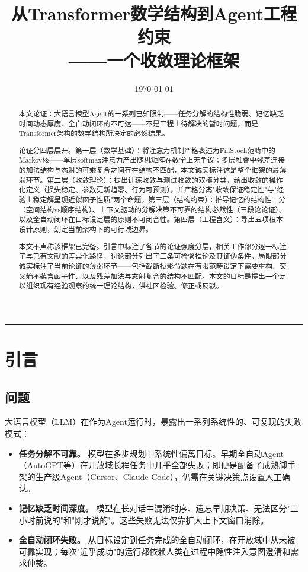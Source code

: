 \documentclass[11pt,a4paper]{ctexart}
\title{\textbf{从Transformer数学结构到Agent工程约束\\[10pt]——一个收敛理论框架}}
\date{\today}
\author{}
\begin{document}
\maketitle

\begin{center}
\rule{0.8\textwidth}{0.5pt}
\end{center}

\begin{abstract}
\noindent
本文论证：大语言模型Agent的一系列已知限制——任务分解的结构性脆弱、记忆缺乏时间动态厚度、全自动闭环的不可达——不是工程上待解决的暂时问题，而是Transformer架构的数学结构所决定的必然结果。

论证分四层展开。第一层（数学基础）：将注意力机制严格表述为FinStoch范畴中的Markov核——单层softmax注意力产出随机矩阵在数学上无争议；多层堆叠中残差连接的加法结构与态射的可乘复合之间存在结构不匹配，本文诚实标注这是整个框架的最薄弱环节。第二层（收敛理论）：提出训练收敛与测试收敛的双模分类，给出收敛的操作化定义（损失稳定、参数更新趋零、行为可预测），并严格分离"收敛保证稳定性"与"经验上稳定解呈现近似函子性质"两个命题。第三层（结构约束）：推导记忆的结构性二分（空间结构vs顺序结构）、上下文驱动的分解决策不可靠的结构必然性（三段论论证）、以及全自动闭环在目标设定层的原则不可闭合性。第四层（工程含义）：导出五项根本设计原则，划定当前架构下的可行域边界。

本文不声称该框架已完备。引言中标注了各节的论证强度分层，相关工作部分逐一标注了与已有文献的差异化路径，讨论部分列出了三条可检验推论及其证伪条件，局限部分诚实标注了当前论证的薄弱环节——包括截断投影命题在有限范畴设定下需要重构、交叉熵不蕴含函子性、以及残差加法与态射复合的结构不匹配。本文的目标是提出一个足以组织现有经验观察的统一理论结构，供社区检验、修正或反驳。
\end{abstract}

\section{引言}

\subsection{问题}

大语言模型（LLM）在作为Agent运行时，暴露出一系列系统性的、可复现的失败模式：

\begin{itemize}[leftmargin=*]
    \item \textbf{任务分解不可靠。} 模型在多步规划中系统性偏离目标。早期全自动Agent（AutoGPT等）在开放域长程任务中几乎全部失败\cite{AutoGPT2023}；即便是配备了成熟脚手架的生产级Agent（Cursor、Claude Code），仍需在关键决策点设置人工确认。
    \item \textbf{记忆缺乏时间深度。} 模型在长对话中混淆时序、遗忘早期决策、无法区分"三小时前说的"和"刚才说的"\cite{Liu2024LostMiddle}。这些失败无法仅靠扩大上下文窗口消除。
    \item \textbf{全自动闭环失败。} 从目标设定到任务完成的全自动闭环，在开放域中从未被可靠实现；每次"近乎成功"的运行都依赖人类在过程中隐性注入意图澄清和需求仲裁\cite{Anthropic2024Agents}。
\end{itemize}
\end{document}
